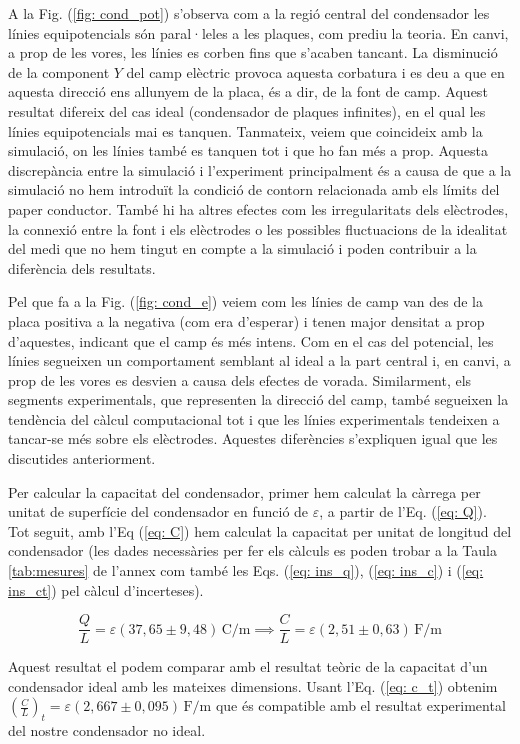 \documentclass[11pt]{article}
\numberwithin{equation}{section}
\numberwithin{figure}{section}
\numberwithin{table}{section}
\begin{document}
A la Fig. (\ref{fig: cond_pot}) s'observa com a la regió central del condensador les línies equipotencials són paral·leles a les plaques, com prediu la teoria. En canvi, a prop de les vores, les línies es corben fins que s'acaben tancant. La disminució de la component $Y$ del camp elèctric provoca aquesta corbatura i es deu a que en aquesta direcció ens allunyem de la placa, és a dir, de la font de camp. Aquest resultat difereix del cas ideal (condensador de plaques infinites), en el qual les línies equipotencials mai es tanquen. Tanmateix, veiem que coincideix amb la simulació, on les línies també es tanquen tot i que ho fan més a prop. Aquesta discrepància entre la simulació i l'experiment principalment és a causa de que a la simulació no hem introduït la condició de contorn relacionada amb els límits del paper conductor. També hi ha altres efectes com les irregularitats dels elèctrodes, la connexió entre la font i els elèctrodes o les possibles fluctuacions de la idealitat del medi que no hem tingut en compte a la simulació i poden contribuir a la diferència dels resultats.

Pel que fa a la Fig. (\ref{fig: cond_e}) veiem com les línies de camp van des de la placa positiva a la negativa (com era d'esperar) i tenen major densitat a prop d'aquestes, indicant que el camp és més intens. Com en el cas del potencial, les línies segueixen un comportament semblant al ideal a la part central i, en canvi, a prop de les vores es desvien a causa dels efectes de vorada. Similarment, els segments experimentals, que representen la direcció del camp, també segueixen la tendència del càlcul computacional tot i que les línies experimentals tendeixen a tancar-se més sobre els elèctrodes. Aquestes diferències s'expliquen igual que les discutides anteriorment.

Per calcular la capacitat del condensador, primer hem calculat la càrrega per unitat de superfície del condensador en funció de $\varepsilon$, a partir de l'Eq. (\ref{eq: Q}). Tot seguit, amb l'Eq (\ref{eq: C}) hem calculat la capacitat per unitat de longitud del condensador (les dades necessàries per fer els càlculs es poden trobar a la Taula \ref{tab:mesures} de l'annex com també les Eqs. (\ref{eq: ins_q}), (\ref{eq: ins_c}) i (\ref{eq: ins_ct}) pel càlcul d'incerteses).

\[
\frac{Q}{L} = \varepsilon  (37{,}65 \pm 9{,}48)\, \mathrm{C/m} \implies
\boxed{ \frac{C}{L} = \varepsilon  (2{,}51 \pm 0{,}63)\, \mathrm{F/m} }
\]    

Aquest resultat el podem comparar amb el resultat teòric de la capacitat d'un condensador ideal amb les mateixes dimensions. Usant l'Eq. (\ref{eq: c_t}) obtenim $(\frac{C}{L})_t =\varepsilon(2,667 \pm 0,095)\, \mathrm{F/m}$ que és compatible amb el resultat experimental del nostre condensador no ideal.
\end{document}
